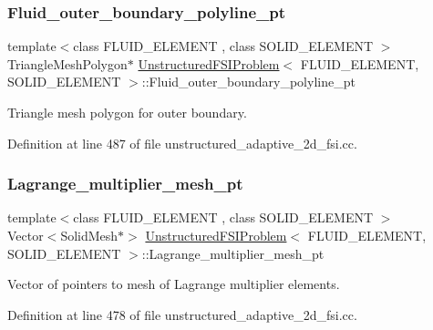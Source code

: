 \subsubsection{\texorpdfstring{Fluid\+\_\+outer\+\_\+boundary\+\_\+polyline\+\_\+pt}{Fluid\_outer\_boundary\_polyline\_pt}}
{\footnotesize\ttfamily template$<$class F\+L\+U\+I\+D\+\_\+\+E\+L\+E\+M\+E\+NT , class S\+O\+L\+I\+D\+\_\+\+E\+L\+E\+M\+E\+NT $>$ \\
Triangle\+Mesh\+Polygon$\ast$ \hyperlink{classUnstructuredFSIProblem}{Unstructured\+F\+S\+I\+Problem}$<$ F\+L\+U\+I\+D\+\_\+\+E\+L\+E\+M\+E\+NT, S\+O\+L\+I\+D\+\_\+\+E\+L\+E\+M\+E\+NT $>$\+::Fluid\+\_\+outer\+\_\+boundary\+\_\+polyline\+\_\+pt\hspace{0.3cm}{\ttfamily [private]}}



Triangle mesh polygon for outer boundary. 



Definition at line 487 of file unstructured\+\_\+adaptive\+\_\+2d\+\_\+fsi.\+cc.

\mbox{\label{classUnstructuredFSIProblem_a2e942a90cc462bf0df04ad28057d4071}} 
\subsubsection{\texorpdfstring{Lagrange\+\_\+multiplier\+\_\+mesh\+\_\+pt}{Lagrange\_multiplier\_mesh\_pt}}
{\footnotesize\ttfamily template$<$class F\+L\+U\+I\+D\+\_\+\+E\+L\+E\+M\+E\+NT , class S\+O\+L\+I\+D\+\_\+\+E\+L\+E\+M\+E\+NT $>$ \\
Vector$<$Solid\+Mesh$\ast$$>$ \hyperlink{classUnstructuredFSIProblem}{Unstructured\+F\+S\+I\+Problem}$<$ F\+L\+U\+I\+D\+\_\+\+E\+L\+E\+M\+E\+NT, S\+O\+L\+I\+D\+\_\+\+E\+L\+E\+M\+E\+NT $>$\+::Lagrange\+\_\+multiplier\+\_\+mesh\+\_\+pt\hspace{0.3cm}{\ttfamily [private]}}



Vector of pointers to mesh of Lagrange multiplier elements. 



Definition at line 478 of file unstructured\+\_\+adaptive\+\_\+2d\+\_\+fsi.\+cc.

